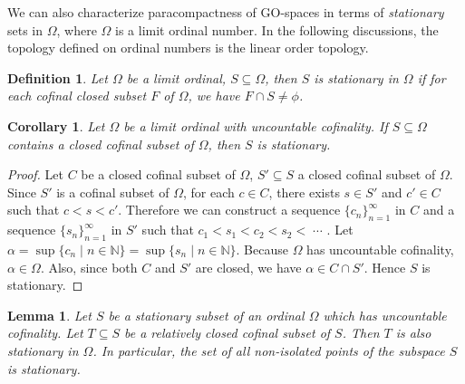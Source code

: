 \documentclass[12pt,oneside,english]{amsbook}
\numberwithin{equation}{section} %
\numberwithin{figure}{section} %
\theoremstyle{plain}
\numberwithin{section}{chapter}
\theoremstyle{plain}
\newtheorem{lem}[thm]{Lemma}
\newtheorem{corollary}[thm]{Corollary}
\newtheorem{defn}[thm]{Definition}
\begin{document}
We can also characterize paracompactness of GO-spaces in terms of \emph{stationary} sets in $\Omega$, where $\Omega$ is a limit ordinal number. In the following discussions, the topology defined on ordinal numbers is the linear order topology.

\begin{defn}
  Let $\Omega$ be a limit ordinal, $S \subseteq \Omega$, then $S$ is stationary in $\Omega$ if for each cofinal closed subset $F$ of $\Omega$, we have $F \cap S \neq \phi$.
\end{defn}

\begin{corollary}
  Let $\Omega$ be a limit ordinal with uncountable cofinality. If $S \subseteq \Omega$ contains a closed cofinal subset of $\Omega$, then $S$ is stationary.
\end{corollary}
\begin{proof}
 Let $C$ be a closed cofinal subset of $\Omega$, $S' \subseteq S$ a closed cofinal subset of $\Omega$. Since $S'$ is a cofinal subset of $\Omega$, for each $c \in C$, there exists $s \in S'$ and $c' \in C$ such that $c < s < c'$. Therefore we can construct a sequence $\{c_{n}\}_{n = 1}^{\infty}$ in $C$ and a sequence $\{s_{n}\}_{n = 1}^{\infty}$ in $S'$ such that $c_1 < s_1 < c_2 < s_2 < \; \cdots$ . Let $\alpha = \sup{\{c_{n} \; | \; n \in \mathbb{N}\}} = \sup{ \{s_{n} \; | \; n \in \mathbb{N} \}}$. Because $\Omega$ has uncountable cofinality, $\alpha \in \Omega$. Also, since both $C$ and $S'$ are closed, we have $\alpha \in C \cap S'$. Hence $S$ is stationary.  
\end{proof}

\begin{lem} \label{lem:paracompact:stationary:1}
Let $S$ be a stationary subset of an ordinal $\Omega$ which has uncountable cofinality. Let $T \subseteq S$ be a relatively closed cofinal subset of $S$. Then $T$ is also stationary in $\Omega$. In particular, the set of all non-isolated points of the subspace $S$ is stationary.
\end{lem}
\end{document}
